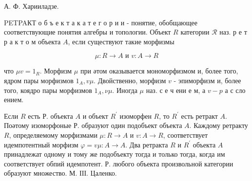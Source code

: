 \documentclass[10pt]{article}
\begin{document}
А. Ф. Харииладзе.



PETPAКТ о б ъ е к т а к а т е г о р и и - понятие, обобщающее соответствующие понятия алгебры и топологии. Объект $R$ категории $\mathscr{R}$ наз. р е т р а к т о м объекта $A$, если существуют такие морфизмы



\[

\mu: R \longrightarrow A \text { и } v: A \longrightarrow R

\]



что $\mu v=1_{R}$. Морфизм $\mu$ при әтом оказывается мономорфизмом и, более того, ядром пары морфизмов $1_{A}, v \mu$. Двойственно, морфизм $v$ - эпиморфизм и, более того, коядро пары морфизмов $1_{A}, \nu \mu$. Иногда $\mu$ наз. с е ч ени е м, а $v-p$ а с сло ением.



Если $R$ есть Р. объекта $A$ и объект $R^{\prime}$ изоморфен $R$, то $R^{\prime}$ есть ретракт $A$. Поәтому изоморфоные Р. образуют один подобъект объекта $A$. Каждому ретракту $R$, определяемому морфизмами $\mu: R \rightarrow A$ и $v: A \rightarrow R$, соответствует идемпотентный морфизм $\varphi=v \mu: A \rightarrow A$. Два ретракта $R$ и $R^{\prime}$ объекта $A$ принадлежат одному и тому же подобъекту тогда и только тогда, когда им соответствует обпий идемпотент. Р. любого объекта произвольной категории образуют множество. М. ІІІ. Цаленко.
\end{document}
